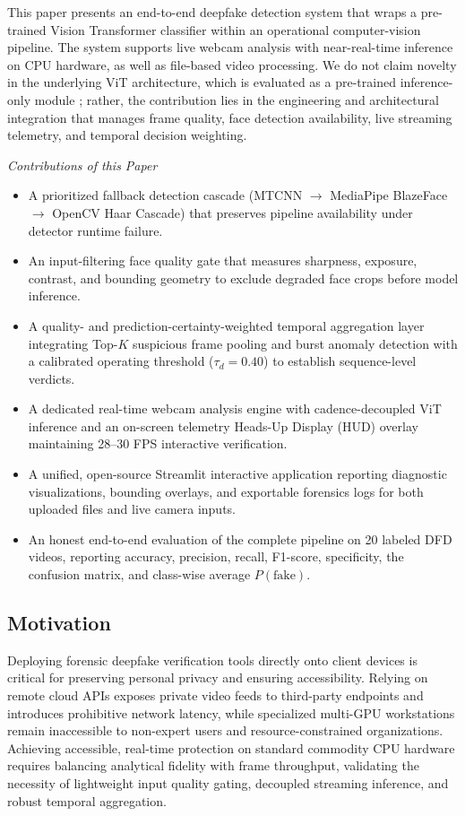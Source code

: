 \documentclass[conference]{IEEEtran}
\begin{document}
This paper presents an end-to-end deepfake detection system that wraps a pre-trained Vision Transformer classifier within an operational computer-vision pipeline. The system supports live webcam analysis with near-real-time inference on CPU hardware, as well as file-based video processing. We do not claim novelty in the underlying ViT architecture, which is evaluated as a pre-trained inference-only module \cite{prithiv2024}; rather, the contribution lies in the engineering and architectural integration that manages frame quality, face detection availability, live streaming telemetry, and temporal decision weighting.

\textit{Contributions of this Paper}
\begin{itemize}
\item A prioritized fallback detection cascade (MTCNN $\rightarrow$ MediaPipe BlazeFace $\rightarrow$ OpenCV Haar Cascade) that preserves pipeline availability under detector runtime failure.
\item An input-filtering face quality gate that measures sharpness, exposure, contrast, and bounding geometry to exclude degraded face crops before model inference.
\item A quality- and prediction-certainty-weighted temporal aggregation layer integrating Top-$K$ suspicious frame pooling and burst anomaly detection with a calibrated operating threshold ($\tau_d = 0.40$) to establish sequence-level verdicts.
\item A dedicated real-time webcam analysis engine with cadence-decoupled ViT inference and an on-screen telemetry Heads-Up Display (HUD) overlay maintaining 28--30 FPS interactive verification.
\item A unified, open-source Streamlit interactive application reporting diagnostic visualizations, bounding overlays, and exportable forensics logs for both uploaded files and live camera inputs.
\item An honest end-to-end evaluation of the complete pipeline on 20 labeled DFD videos, reporting accuracy, precision, recall, F1-score, specificity, the confusion matrix, and class-wise average $P(\text{fake})$.
\end{itemize}

\subsection{Motivation}
Deploying forensic deepfake verification tools directly onto client devices is critical for preserving personal privacy and ensuring accessibility. Relying on remote cloud APIs exposes private video feeds to third-party endpoints and introduces prohibitive network latency, while specialized multi-GPU workstations remain inaccessible to non-expert users and resource-constrained organizations. Achieving accessible, real-time protection on standard commodity CPU hardware requires balancing analytical fidelity with frame throughput, validating the necessity of lightweight input quality gating, decoupled streaming inference, and robust temporal aggregation.
\end{document}
